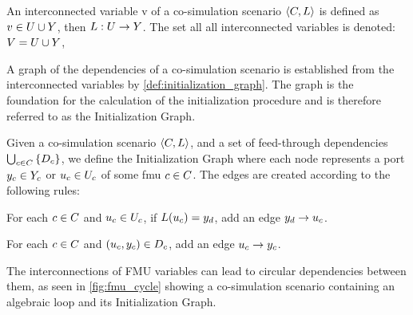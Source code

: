 \begin{definition}
An interconnected variable v of a co-simulation scenario $ \left\langle C, L \right\rangle $ is defined as $v \in U \cup Y$, then $L : U \to Y$.
The set all all interconnected variables is denoted: $V = U \cup Y$,
\end{definition}

A graph of the dependencies of a co-simulation scenario is established from the interconnected variables by \cref{def:initialization_graph}. The graph is the foundation for the calculation of the initialization procedure and is therefore referred to as the Initialization Graph.

\begin{definition}\label{def:initialization_graph}
  Given a co-simulation scenario $ \left\langle C, L \right\rangle $, and a set of feed-through dependencies $\bigcup_{c \in C}  \left\{ D_{c} \right\}$, we define the Initialization Graph where each node represents a port $y_{c} \in Y_{c}$ or $u_{c} \in U_{c}$ of some fmu $c \in C$. The edges are created according to the following rules:
  \begin{compactenum}
    \item For each $c \in C$ and $u_{c} \in U_{c}$, if $L(u_{c}) = y_{d}$, add an edge $y_{d} -> u_{c}$.
    \item For each $c \in C$ and $(u_{c},y_{c}) \in D_{c}$, add an edge $u_{c} -> y_{c}$.
  \end{compactenum}
\end{definition}

The interconnections of FMU variables can lead to circular dependencies between them, as seen in \cref{fig:fmu_cycle} showing a co-simulation scenario containing an algebraic loop and its Initialization Graph.

